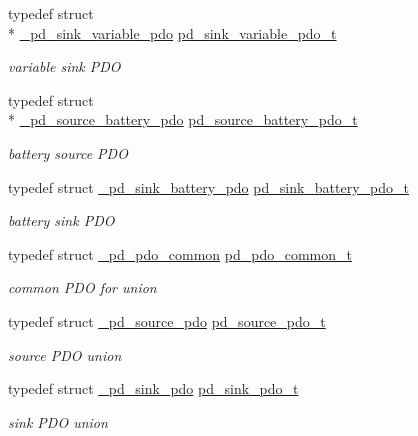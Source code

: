 \begin{DoxyCompactItemize}
typedef struct \\*
\hyperlink{struct__pd__sink__variable__pdo}{\-\_\-pd\-\_\-sink\-\_\-variable\-\_\-pdo} \hyperlink{group__usb__pd__stack_gaf18073722dd91e4b87b60a6db76dc8dc}{pd\-\_\-sink\-\_\-variable\-\_\-pdo\-\_\-t}
\begin{DoxyCompactList}\small\item\em variable sink P\-D\-O \end{DoxyCompactList}\item 
typedef struct \\*
\hyperlink{struct__pd__source__battery__pdo}{\-\_\-pd\-\_\-source\-\_\-battery\-\_\-pdo} \hyperlink{group__usb__pd__stack_ga5f2a906851b2fe0554a083085c62324b}{pd\-\_\-source\-\_\-battery\-\_\-pdo\-\_\-t}
\begin{DoxyCompactList}\small\item\em battery source P\-D\-O \end{DoxyCompactList}\item 
typedef struct \hyperlink{struct__pd__sink__battery__pdo}{\-\_\-pd\-\_\-sink\-\_\-battery\-\_\-pdo} \hyperlink{group__usb__pd__stack_ga917a58335ea75ba8b8cc3c359e1dee7a}{pd\-\_\-sink\-\_\-battery\-\_\-pdo\-\_\-t}
\begin{DoxyCompactList}\small\item\em battery sink P\-D\-O \end{DoxyCompactList}\item 
typedef struct \hyperlink{struct__pd__pdo__common}{\-\_\-pd\-\_\-pdo\-\_\-common} \hyperlink{group__usb__pd__stack_ga7b2f5a42b9f5ae0e5b76f2ed44482ff3}{pd\-\_\-pdo\-\_\-common\-\_\-t}
\begin{DoxyCompactList}\small\item\em common P\-D\-O for union \end{DoxyCompactList}\item 
typedef struct \hyperlink{struct__pd__source__pdo}{\-\_\-pd\-\_\-source\-\_\-pdo} \hyperlink{group__usb__pd__stack_gae3adfd5239231ab405b04bef0ae1df5a}{pd\-\_\-source\-\_\-pdo\-\_\-t}
\begin{DoxyCompactList}\small\item\em source P\-D\-O union \end{DoxyCompactList}\item 
typedef struct \hyperlink{struct__pd__sink__pdo}{\-\_\-pd\-\_\-sink\-\_\-pdo} \hyperlink{group__usb__pd__stack_gaf835814fe2dcf1f17e9e0c58bc74b6ba}{pd\-\_\-sink\-\_\-pdo\-\_\-t}
\begin{DoxyCompactList}\small\item\em sink P\-D\-O union \end{DoxyCompactList}\item 

\end{DoxyCompactItemize}

